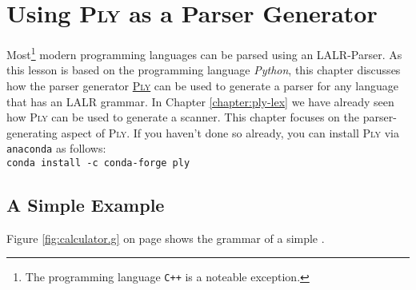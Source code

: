 \chapter{Using \textsc{Ply} as a Parser Generator  \label{chapter:ply}}
Most\footnote{The programming language \texttt{C++} is a noteable exception.} modern programming languages can
be parsed using an LALR-Parser.  As this lesson is based on the programming language \textsl{Python}, this
chapter discusses how the parser generator \href{https://www.dabeaz.com/ply/}{\textsc{Ply}} can be used to
generate a parser for any language that has an LALR grammar.  In Chapter \ref{chapter:ply-lex} we have already
seen how \textsc{Ply} can be used to generate a scanner.  This chapter focuses on the parser-generating aspect
of \textsc{Ply}.   If you haven't done so already, you can install \textsc{Ply} via \texttt{anaconda} as follows:
\\[0.2cm]
\hspace*{1.3cm}
\texttt{conda install -c conda-forge ply}


\section{A Simple Example}
Figure \ref{fig:calculator.g} on page \pageref{fig:calculator.g} shows the grammar of a simple 
.  

